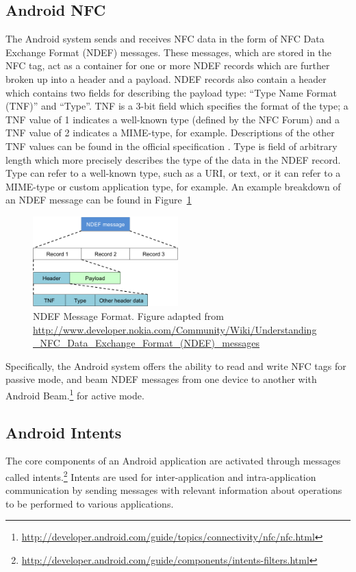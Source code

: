 \documentclass[12pt]{article}
\begin{document}
\subsection{Android NFC}
The Android system sends and receives NFC data in the form of NFC Data Exchange Format (NDEF) messages.
These messages, which are stored in the NFC tag, act as a container for one or more NDEF records which are further broken up into a header and a payload.
NDEF records also contain a header which contains two fields for describing the payload type: ``Type Name Format (TNF)'' and ``Type''.
TNF is a 3-bit field which specifies the format of the type; a TNF value of 1 indicates a well-known type (defined by the NFC Forum) and a TNF value of 2 indicates a MIME-type, for example.
Descriptions of the other TNF values can be found in the official specification \cite{ndef}.
Type is field of arbitrary length which more precisely describes the type of the data in the NDEF record.
Type can refer to a well-known type, such as a URI, or text, or it can refer to a MIME-type or custom application type, for example.
An example breakdown of an NDEF message can be found in Figure~\ref{fig:background:ndef}

\begin{figure}[h!]
	\centering
		\includegraphics[width=0.5\textwidth]{NDEF_Format.png}
	\caption[Caption for LOF]%
		{NDEF Message Format. Figure adapted from \\{\scriptsize\url{http://www.developer.nokia.com/Community/Wiki/Understanding_NFC_Data_Exchange_Format_(NDEF)_messages}}}
  \label{fig:background:ndef}

\end{figure}

Specifically, the Android system offers the ability to read and write NFC tags for passive mode, and beam NDEF messages from one device to another with Android Beam.\footnote{\url{http://developer.android.com/guide/topics/connectivity/nfc/nfc.html}} for active mode. 

\subsection{Android Intents}
\label{sec:background:intents}
The core components of an Android application are activated through messages called intents.\footnote{\url{http://developer.android.com/guide/components/intents-filters.html}}
Intents are used for inter-application and intra-application communication by sending messages with relevant information about operations to be performed to various applications.  
\end{document}
